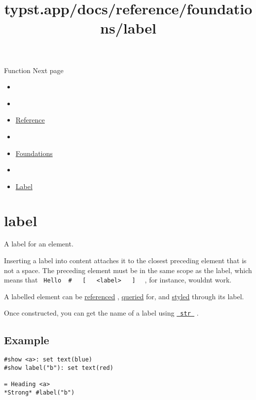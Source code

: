 { Function } { Next page }


\title{typst.app/docs/reference/foundations/label}

\begin{itemize}
\tightlist
\item
  \href{/docs}{}
\item
  
\item
  \href{/docs/reference/}{Reference}
\item
  
\item
  \href{/docs/reference/foundations/}{Foundations}
\item
  
\item
  \href{/docs/reference/foundations/label/}{Label}
\end{itemize}

\section{\texorpdfstring{{ label }}{ label }}\label{summary}

A label for an element.

Inserting a label into content attaches it to the closest preceding
element that is not a space. The preceding element must be in the same
scope as the label, which means that
\texttt{\ Hello\ }{\texttt{\ \#\ }}\texttt{\ }{\texttt{\ {[}\ }}\texttt{\ }{\texttt{\ \textless{}label\textgreater{}\ }}\texttt{\ }{\texttt{\ {]}\ }}\texttt{\ }
, for instance, wouldn\textquotesingle t work.

A labelled element can be \href{/docs/reference/model/ref/}{referenced}
, \href{/docs/reference/introspection/query/}{queried} for, and
\href{/docs/reference/styling/}{styled} through its label.

Once constructed, you can get the name of a label using
\href{/docs/reference/foundations/str/\#constructor}{\texttt{\ str\ }} .

\subsection{Example}\label{example}

\begin{verbatim}
#show <a>: set text(blue)
#show label("b"): set text(red)

= Heading <a>
*Strong* #label("b")
\end{verbatim}


